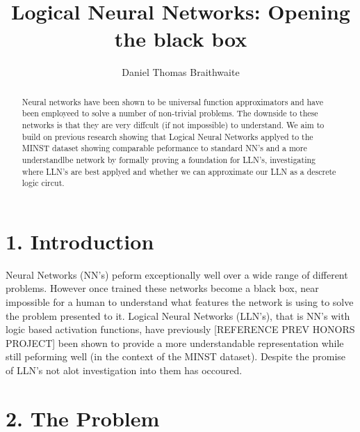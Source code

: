 \documentclass[11pt, a4paper, twoside, openright]{report}
\title{Logical Neural Networks: Opening the black box}
\author{Daniel Thomas Braithwaite}
\date{}
\begin{document}
\frontmatter


\begin{abstract}
Neural networks have been shown to be universal function approximators  and have been employeed to solve a number of non-trivial problems. The downside to these networks is that they are very diffcult (if not impossible) to understand. We aim to build on previous research showing that Logical Neural Networks applyed to the MINST dataset showing comparable peformance to standard NN's and a more understandlbe network by formally proving a foundation for LLN's, investigating where LLN's are best applyed and whether we can approximate our LLN as a descrete logic circut.
\end{abstract}


\maketitle




\mainmatter


\section*{1. Introduction}

Neural Networks (NN's) peform exceptionally well over a wide range of different problems. However once trained these networks become a black box, near impossible for a human to understand what features the network is using to solve the problem presented to it. Logical Neural Networks (LLN's), that is NN's with logic based activation functions, have previously [REFERENCE PREV HONORS PROJECT] been shown to provide a more understandable representation while still peforming well (in the context of the MINST dataset). Despite the promise of LLN's not alot investigation into them has occoured.

\section*{2. The Problem}
\end{document}

